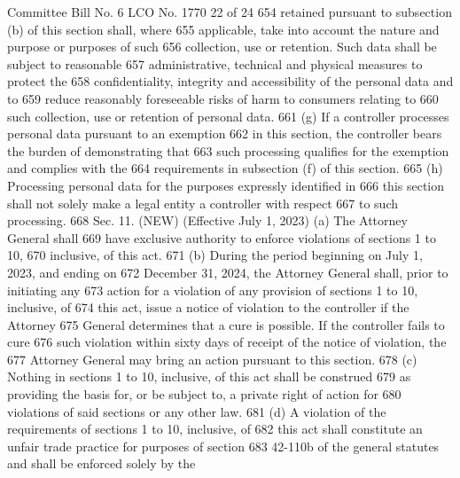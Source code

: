 Committee Bill No. 6
LCO No. 1770 22 of 24
654 retained pursuant to subsection (b) of this section shall, where
655 applicable, take into account the nature and purpose or purposes of such
656 collection, use or retention. Such data shall be subject to reasonable
657 administrative, technical and physical measures to protect the
658 confidentiality, integrity and accessibility of the personal data and to
659 reduce reasonably foreseeable risks of harm to consumers relating to
660 such collection, use or retention of personal data.
661 (g) If a controller processes personal data pursuant to an exemption
662 in this section, the controller bears the burden of demonstrating that
663 such processing qualifies for the exemption and complies with the
664 requirements in subsection (f) of this section.
665 (h) Processing personal data for the purposes expressly identified in
666 this section shall not solely make a legal entity a controller with respect
667 to such processing.
668 Sec. 11. (NEW) (Effective July 1, 2023) (a) The Attorney General shall
669 have exclusive authority to enforce violations of sections 1 to 10,
670 inclusive, of this act.
671 (b) During the period beginning on July 1, 2023, and ending on
672 December 31, 2024, the Attorney General shall, prior to initiating any
673 action for a violation of any provision of sections 1 to 10, inclusive, of
674 this act, issue a notice of violation to the controller if the Attorney
675 General determines that a cure is possible. If the controller fails to cure
676 such violation within sixty days of receipt of the notice of violation, the
677 Attorney General may bring an action pursuant to this section.
678 (c) Nothing in sections 1 to 10, inclusive, of this act shall be construed
679 as providing the basis for, or be subject to, a private right of action for
680 violations of said sections or any other law.
681 (d) A violation of the requirements of sections 1 to 10, inclusive, of
682 this act shall constitute an unfair trade practice for purposes of section
683 42-110b of the general statutes and shall be enforced solely by the 

